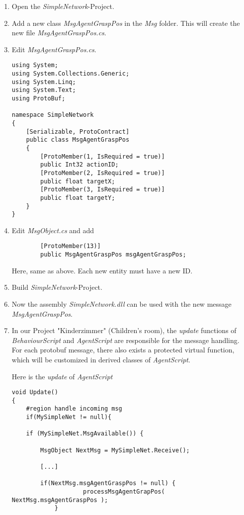 \documentclass[a4paper,11pt,oneside,pdftex]{scrartcl}
\begin{document}
\begin{enumerate}
\item Open the \emph{SimpleNetwork}-Project.
\item Add a new class \emph{MsgAgentGraspPos} in the \emph{Msg} folder. This will create the new file \emph{MsgAgentGraspPos.cs}.
\item Edit \emph{MsgAgentGraspPos.cs}.
\begin{lstlisting}
using System;
using System.Collections.Generic;
using System.Linq;
using System.Text;
using ProtoBuf;

namespace SimpleNetwork
{
    [Serializable, ProtoContract]
    public class MsgAgentGraspPos
    {
        [ProtoMember(1, IsRequired = true)]
        public Int32 actionID;       
        [ProtoMember(2, IsRequired = true)]
        public float targetX;    
        [ProtoMember(3, IsRequired = true)]
        public float targetY;
    }
} 
\end{lstlisting}
\item Edit \emph{MsgObject.cs} and add
\begin{lstlisting}
        [ProtoMember(13)]
        public MsgAgentGraspPos msgAgentGraspPos;   
\end{lstlisting}
Here, same as above. Each new entity must have a new ID.
\item Build \emph{SimpleNetwork}-Project.
\item Now the assembly \emph{SimpleNetwork.dll} can be used with the new message\\\emph{MsgAgentGraspPos}.

\item In our Project "Kinderzimmer" (Children's room), the \emph{update} functions of \emph{BehaviourScript} and \emph{AgentScript} are responsible for the message handling. For each protobuf message, there also exists a protected virtual function, which will be customized in derived classes of \emph{AgentScript}.

Here is the  \emph{update} of \emph{AgentScript}
\begin{lstlisting}
void Update()
{
	#region handle incoming msg
	if(MySimpleNet != null){
	
	if (MySimpleNet.MsgAvailable()) {

		MsgObject NextMsg = MySimpleNet.Receive();

		[...]
           	
		if(NextMsg.msgAgentGraspPos != null) {
                	processMsgAgentGrapPos( NextMsg.msgAgentGraspPos );
          	}


\end{lstlisting}
\end{enumerate}
\end{document}
